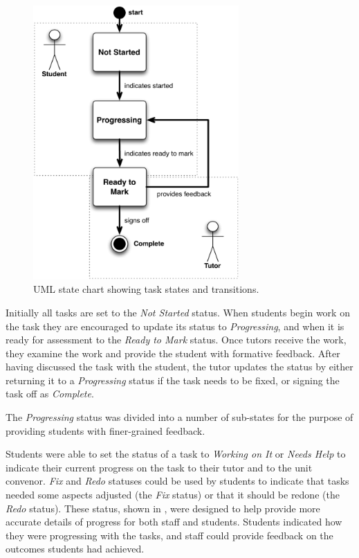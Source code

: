 \begin{figure}[thbp]
  \centering
  \includegraphics[width=0.7\textwidth]{BasicProcessStateChart}
  \caption{UML state chart showing task states and transitions.}
  \label{fig:basic_process_chart}
\end{figure}

Initially all tasks are set to the \emph{Not Started} status. When students begin work on the task they are encouraged to update its status to \emph{Progressing}, and when it is ready for assessment to the \emph{Ready to Mark} status. Once tutors receive the work, they examine the work and provide the student with formative feedback. After having discussed the task with the student, the tutor updates the status by either returning it to a \emph{Progressing} status if the task needs to be fixed, or signing the task off as \emph{Complete}.

The \emph{Progressing} status was divided into a number of sub-states for the purpose of providing students with finer-grained feedback. 

Students were able to set the status of a task to \emph{Working on It} or \emph{Needs Help} to indicate their current progress on the task to their tutor and to the unit convenor. \emph{Fix} and \emph{Redo} statuses could be used by students to indicate that tasks needed some aspects adjusted (the \emph{Fix} status) or that it should be redone (the \emph{Redo} status). These status, shown in , were designed to help provide more accurate details of progress for both staff and students. Students indicated how they were progressing with the tasks, and staff could provide feedback on the outcomes students had achieved.


